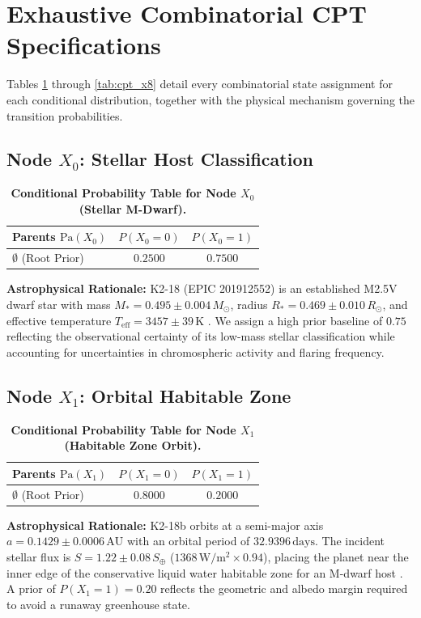 \section{Exhaustive Combinatorial CPT Specifications}\label{sec:app_cpt_specifications}

Tables \ref{tab:cpt_x0} through \ref{tab:cpt_x8} detail every combinatorial state assignment for each conditional distribution, together with the physical mechanism governing the transition probabilities.

\subsection{Node $X_0$: Stellar Host Classification}
\begin{table}[htbp]
\centering
\caption{\textbf{Conditional Probability Table for Node $X_0$ (Stellar M-Dwarf).}}
\label{tab:cpt_x0}
\small
\begin{tabular}{lcc}
\toprule
\textbf{Parents $\mathrm{Pa}(X_0)$} & $P(X_0 = 0)$ & $P(X_0 = 1)$ \\
\midrule
$\emptyset$ (Root Prior) & $0.2500$ & $0.7500$ \\
\bottomrule
\end{tabular}
\end{table}
\textbf{Astrophysical Rationale:} K2-18 (EPIC 201912552) is an established M2.5V dwarf star with mass $M_* = 0.495 \pm 0.004\,M_\odot$, radius $R_* = 0.469 \pm 0.010\,R_\odot$, and effective temperature $T_{\mathrm{eff}} = 3457 \pm 39\,\mathrm{K}$ \cite{benneke2019}. We assign a high prior baseline of $0.75$ reflecting the observational certainty of its low-mass stellar classification while accounting for uncertainties in chromospheric activity and flaring frequency.

\subsection{Node $X_1$: Orbital Habitable Zone}
\begin{table}[htbp]
\centering
\caption{\textbf{Conditional Probability Table for Node $X_1$ (Habitable Zone Orbit).}}
\label{tab:cpt_x1}
\small
\begin{tabular}{lcc}
\toprule
\textbf{Parents $\mathrm{Pa}(X_1)$} & $P(X_1 = 0)$ & $P(X_1 = 1)$ \\
\midrule
$\emptyset$ (Root Prior) & $0.8000$ & $0.2000$ \\
\bottomrule
\end{tabular}
\end{table}
\textbf{Astrophysical Rationale:} K2-18b orbits at a semi-major axis $a = 0.1429 \pm 0.0006\,\mathrm{AU}$ with an orbital period of $32.9396\,\mathrm{days}$. The incident stellar flux is $S = 1.22 \pm 0.08\,S_\oplus$ ($1368\,\mathrm{W/m^2} \times 0.94$), placing the planet near the inner edge of the conservative liquid water habitable zone for an M-dwarf host \cite{benneke2019, madhusudhan2023}. A prior of $P(X_1 = 1) = 0.20$ reflects the geometric and albedo margin required to avoid a runaway greenhouse state.

